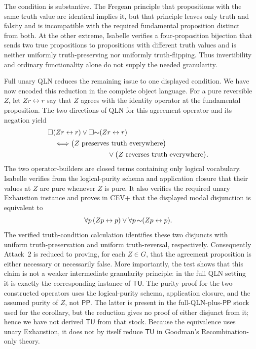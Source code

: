 \documentclass[12pt,leqno]{article}
\newcommand{\OR}{\ensuremath{\vee}}
\newcommand{\NOT}{\ensuremath{\text{$\thicksim$}}}
\theoremstyle{plain}
\theoremstyle{definition}
\newcommand{\PP}{\ensuremath{\mathsf{PP}}}
\newcommand{\TU}{\ensuremath{\mathsf{TU}}}
\begin{document}
The condition is substantive.  The Fregean principle that propositions with
the same truth value are identical implies it, but that principle leaves only
truth and falsity and is incompatible with the required fundamental
proposition distinct from both.  At the other extreme, Isabelle verifies a
four-proposition bijection that sends two true propositions to propositions
with different truth values and is neither uniformly truth-preserving nor
uniformly truth-flipping.  Thus invertibility and
ordinary functionality alone do not supply the needed granularity.

Full unary QLN reduces the remaining issue to one displayed condition.  We
have now encoded this reduction in the complete object language.  For a
pure reversible \(Z\), let \(Zr\leftrightarrow r\) say that \(Z\) agrees with
the identity operator at the fundamental proposition.  The two directions of
QLN for this agreement operator and its negation yield
\[
\begin{split}
 &\Box(Zr\leftrightarrow r)
       \mathbin{\OR}\Box\NOT(Zr\leftrightarrow r)\\
 &\quad\Longleftrightarrow
   \bigl(Z\text{ preserves truth everywhere}\bigr)\\
 &\hspace{1.2in}\mathbin{\OR}
   \bigl(Z\text{ reverses truth everywhere}\bigr).
\end{split}
\]
The two operator-builders are closed terms containing only logical vocabulary.
Isabelle verifies from the logical-purity schema and application closure that
their values at \(Z\) are pure whenever \(Z\) is pure.  It also verifies the required unary
Exhaustion instance and proves in CEV+ that the displayed modal disjunction is
equivalent to
\[
  \forall p\,(Zp\leftrightarrow p)
  \mathbin{\OR}
  \forall p\,\NOT(Zp\leftrightarrow p).
\]
The verified truth-condition calculation identifies these two disjuncts with
uniform truth-preservation and uniform truth-reversal, respectively.
Consequently Attack~2 is reduced to proving, for each \(Z\in G\), that the
agreement proposition is either necessary or necessarily false.  More
importantly, the test shows that this claim is not a weaker intermediate
granularity principle: in the full QLN setting it is exactly the corresponding
instance of \TU.  The purity proof for the two constructed operators uses the
logical-purity schema, application closure, and the assumed purity of \(Z\),
not \PP.  The latter is present in the full-QLN-plus-\PP{} stock used for the
corollary, but the reduction gives no proof of either disjunct from it; hence
we have not derived \TU{} from that stock.  Because the equivalence uses unary
Exhaustion, it does not by itself reduce \TU{} in Goodman's
Recombination-only theory.
\end{document}
